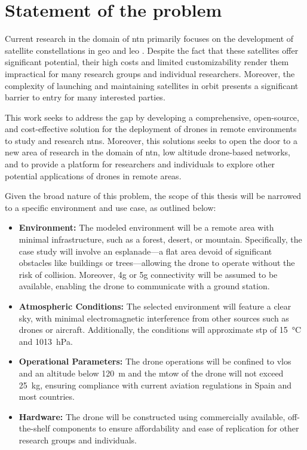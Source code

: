 
\chapter{Statement of the problem}\label{ch:statement_of_problem}

Current research in the domain of \gls{ntn} primarily focuses on the development of satellite constellations in \gls{geo} and \gls{leo} \autocite{non_terrestial_networks_trends}. Despite the fact that these satellites offer significant potential, their high costs and limited customizability render them impractical for many research groups and individual researchers. Moreover, the complexity of launching and maintaining satellites in orbit presents a significant barrier to entry for many interested parties.

This work seeks to address the gap by developing a comprehensive, open-source, and cost-effective solution for the deployment of drones in remote environments to study and research \glspl{ntn}. Moreover, this solutions seeks to open the door to a new area of research in the domain of \gls{ntn}, low altitude drone-based networks, and to provide a platform for researchers and individuals to explore other potential applications of drones in remote areas.

Given the broad nature of this problem, the scope of this thesis will be narrowed to a specific environment and use case, as outlined below:

\begin{itemize}
  \item \textbf{Environment:} The modeled environment will be a remote area with minimal infrastructure, such as a forest, desert, or mountain. Specifically, the case study will involve an esplanade—a flat area devoid of significant obstacles like buildings or trees—allowing the drone to operate without the risk of collision. Moreover, \gls{4g} or \gls{5g} connectivity will be assumed to be available, enabling the drone to communicate with a ground station.

  \item \textbf{Atmospheric Conditions:} The selected environment will feature a clear sky, with minimal electromagnetic interference from other sources such as drones or aircraft. Additionally, the conditions will approximate \gls{stp} of \SI{15}{\degreeCelsius} and \SI{1013}{\hecto\pascal}.

  \item \textbf{Operational Parameters:} The drone operations will be confined to \gls{vlos} and an altitude below \SI{120}{\metre} and the \gls{mtow} of the drone will not exceed \SI{25}{\kilogram}, ensuring compliance with current aviation regulations in Spain and most countries.

  \item \textbf{Hardware:} The drone will be constructed using commercially available, off-the-shelf components to ensure affordability and ease of replication for other research groups and individuals.
\end{itemize}

